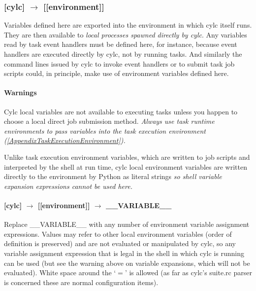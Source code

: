 \subsubsection[{[[}environment{]]} ]{[cylc] $\rightarrow$ [[environment]]}

Variables defined here are exported into the environment in which cylc
itself runs. They are then available to {\em local processes spawned
directly by cylc}. Any variables read by task event handlers must be
defined here, for instance, because event handlers are executed
directly by cylc, not by running tasks. And similarly the {command
lines} issued by cylc to invoke event handlers or to submit task 
job scripts could, in principle, make use of environment variables
defined here. 
\paragraph{Warnings}

\begin{myitemize}
    \item Cylc local variables are not available to
        executing tasks unless you happen to choose a local direct job
        submission method.  {\em Always use task runtime environments to
        pass variables into the task execution environment
        (\ref{AppendixTaskExecutionEnvironment}).}
    \item Unlike task execution environment variables, which are written
        to job scripts and interpreted by the shell at run time, 
        cylc local environment variables are written directly 
        to the environment by Python as literal strings {\em  so 
        shell variable expansion expressions cannot be used here.}
\end{myitemize}

\paragraph[\_\_VARIABLE\_\_ ]{[cylc] $\rightarrow$ [[environment]] $\rightarrow$ \_\_VARIABLE\_\_}

Replace \_\_VARIABLE\_\_ with any number of environment variable
assignment expressions.
Values may refer to other local environment variables (order of
definition is preserved) and are not evaluated or manipulated by 
cylc, so any variable assignment expression that is legal in the 
shell in which cylc is running can be used (but see the warning 
above on variable expansions, which will not be evaluated).
White space around the `$=$' is allowed (as far as cylc's suite.rc 
parser is concerned these are normal configuration items).

